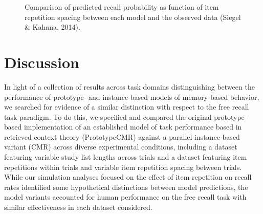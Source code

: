 \documentclass[
  letterpaper,
]{article}
\begin{document}
\begin{figure}
\begin{minipage}[t]{0.33\linewidth}
{\centering 


}

\end{minipage}%

\caption{\label{fig-lohnas_spacing}Comparison of predicted recall
probability as function of item repetition spacing between each model
and the observed data (Siegel \& Kahana, 2014).}

\end{figure}

\hypertarget{discussion}{%
\section{Discussion}\label{discussion}}

In light of a collection of results across task domains distinguishing
between the performance of prototype- and instance-based models of
memory-based behavior, we searched for evidence of a similar distinction
with respect to the free recall task paradigm. To do this, we specified
and compared the original prototype-based implementation of an
established model of task performance based in retrieved context theory
(PrototypeCMR) against a parallel instance-based variant (CMR) across
diverse experimental conditions, including a dataset featuring variable
study list lengths across trials and a dataset featuring item
repetitions within trials and variable item repetition spacing between
trials. While our simulation analyses focused on the effect of item
repetition on recall rates identified some hypothetical distinctions
between model predictions, the model variants accounted for human
performance on the free recall task with similar effectiveness in each
dataset considered.
\end{document}
